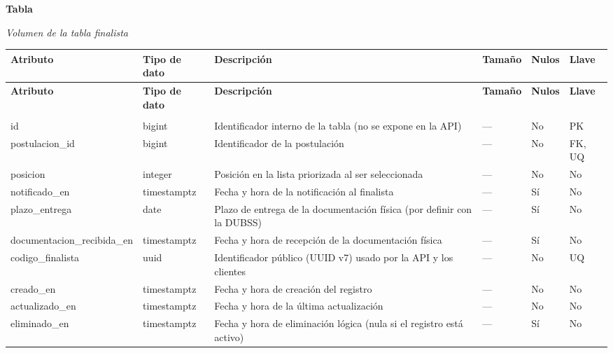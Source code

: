 \label{tab:volumen_finalista}
\noindent\textbf{Tabla~\thetable}\par\nopagebreak
\noindent\textit{Volumen de la tabla finalista}\par\nopagebreak
\begingroup\small\linespread{1}\selectfont\setlength{\tabcolsep}{4pt}
\begin{longtable}{>{\raggedright\arraybackslash}p{3.4cm} >{\raggedright\arraybackslash}p{2.5cm} >{\raggedright\arraybackslash}p{4.8cm} >{\centering\arraybackslash}p{1.6cm}>{\centering\arraybackslash}p{1.1cm} >{\centering\arraybackslash}p{1.3cm}}
\toprule
\textbf{Atributo} & \textbf{Tipo de dato} & \textbf{Descripción} & \textbf{Tamaño} & \textbf{Nulos} & \textbf{Llave} \\
\midrule
\endfirsthead
\toprule
\textbf{Atributo} & \textbf{Tipo de dato} & \textbf{Descripción} & \textbf{Tamaño} & \textbf{Nulos} & \textbf{Llave} \\
\midrule
\endhead
\endfoot
\bottomrule
\multicolumn{6}{l}{\textit{Nota.} Elaboración propia.} \\
\endlastfoot
id & bigint & Identificador interno de la tabla (no se expone en la API) & — & No & PK \\
postulacion\_\allowbreak{}id & bigint & Identificador de la postulación & — & No & FK, UQ \\
posicion & integer & Posición en la lista priorizada al ser seleccionada & — & No & No \\
notificado\_\allowbreak{}en & timestamptz & Fecha y hora de la notificación al finalista & — & Sí & No \\
plazo\_\allowbreak{}entrega & date & Plazo de entrega de la documentación física (por definir con la DUBSS) & — & Sí & No \\
documentacion\_\allowbreak{}recibida\_\allowbreak{}en & timestamptz & Fecha y hora de recepción de la documentación física & — & Sí & No \\
codigo\_\allowbreak{}finalista & uuid & Identificador público (UUID v7) usado por la API y los clientes & — & No & UQ \\
creado\_\allowbreak{}en & timestamptz & Fecha y hora de creación del registro & — & No & No \\
actualizado\_\allowbreak{}en & timestamptz & Fecha y hora de la última actualización & — & No & No \\
eliminado\_\allowbreak{}en & timestamptz & Fecha y hora de eliminación lógica (nula si el registro está activo) & — & Sí & No \\
\end{longtable}
\endgroup
\addtocounter{table}{-1}

